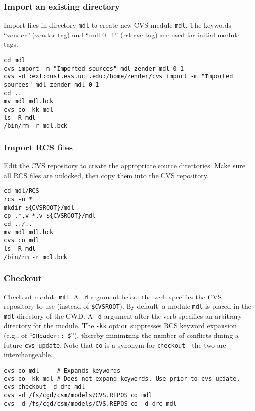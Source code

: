 \documentclass[12pt,twoside]{article}
\newcommand{\CVScolon}{:}
\begin{document}
\subsubsection[Import]{Import an existing directory}\label{sxn:cvs_mpr}
Import files in directory \verb'mdl' to create new CVS module
\verb'mdl'.    
The keywords ``zender'' (vendor tag) and ``mdl-0\_1'' (release tag)
are used for initial module tags. 
\begin{verbatim}
cd mdl
cvs import -m "Imported sources" mdl zender mdl-0_1
cvs -d :ext:dust.ess.uci.edu:/home/zender/cvs import -m "Imported sources" mdl zender mdl-0_1
cd ..
mv mdl mdl.bck
cvs co -kk mdl
ls -R mdl
/bin/rm -r mdl.bck
\end{verbatim}

\subsubsection[Import RCS]{Import RCS files}
Edit the CVS repository to create the appropriate source directories. 
Make sure all RCS files are unlocked, then copy them into the CVS
repository. 
\begin{verbatim}
cd mdl/RCS
rcs -u *
mkdir ${CVSROOT}/mdl
cp .*,v *,v ${CVSROOT}/mdl
cd ../..
mv mdl mdl.bck
cvs co mdl
ls -R mdl
/bin/rm -r mdl.bck
\end{verbatim}

\subsubsection[Checkout]{Checkout}
Checkout module \verb'mdl'. A \verb'-d' argument before the
verb specifies the CVS repository to use (instead of
\texttt{\$CVSROOT}). %
By default, a module \verb'mdl' is placed in the \verb'mdl' directory
of the CWD. 
A \verb'-d' argument after the verb specifies an arbitrary directory
for the module.
The \verb'-kk' option suppresses RCS keyword expansion (e.g., of
``\texttt{\$Header\CVScolon: \$}''), thereby minimizing the number of
conflicts during a future \texttt{cvs update}. 
Note that \verb'co' is a synonym for \verb'checkout'---the two are
interchangeable. 
\begin{verbatim}
cvs co mdl     # Expands keywords
cvs co -kk mdl # Does not expand keywords. Use prior to cvs update.
cvs checkout -d drc mdl
cvs -d /fs/cgd/csm/models/CVS.REPOS co mdl
cvs -d /fs/cgd/csm/models/CVS.REPOS co -d drc mdl
\end{verbatim}
\end{document}
